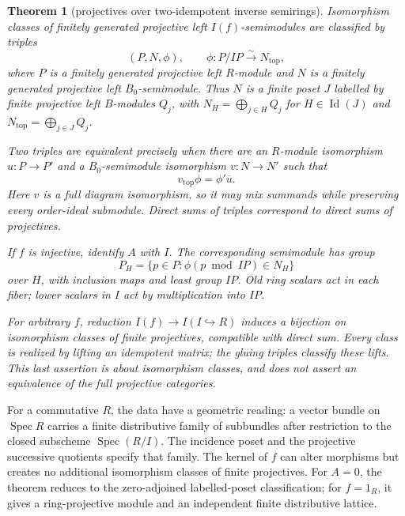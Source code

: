 \documentclass[11pt]{amsart}
\DeclareMathOperator{\Spec}{Spec}
\DeclareMathOperator{\Id}{Id}
\newtheorem{theorem}{Theorem}[section]
\theoremstyle{definition}
\theoremstyle{remark}
\begin{document}
\begin{theorem}[projectives over two-idempotent inverse semirings]\label{thm:twolevelprojectives}
Isomorphism classes of finitely generated projective left $I(f)$-semimodules are classified by triples
\[
 (P,N,\phi),\qquad \phi:P/IP\xrightarrow{\sim}N_{\mathrm{top}},
\]
where $P$ is a finitely generated projective left $R$-module and $N$ is a finitely generated projective left $B_0$-semimodule. Thus $N$ is a finite poset $J$ labelled by finite projective left $B$-modules $Q_j$, with $N_H=\bigoplus_{j\in H}Q_j$ for $H\in\Id(J)$ and $N_{\mathrm{top}}=\bigoplus_{j\in J}Q_j$.

Two triples are equivalent precisely when there are an $R$-module isomorphism $u:P\to P'$ and a $B_0$-semimodule isomorphism $v:N\to N'$ such that
\[
 v_{\mathrm{top}}\phi=\phi'\overline u.
\]
Here $v$ is a full diagram isomorphism, so it may mix summands while preserving every order-ideal submodule. Direct sums of triples correspond to direct sums of projectives.

If $f$ is injective, identify $A$ with $I$. The corresponding semimodule has group
\begin{equation}\label{eq:twolevelfiber}
 P_H=\{p\in P:\phi(p\bmod IP)\in N_H\}
\end{equation}
over $H$, with inclusion maps and least group $IP$. Old ring scalars act in each fiber; lower scalars in $I$ act by multiplication into $IP$.

For arbitrary $f$, reduction $I(f)\to I(I\hookrightarrow R)$ induces a bijection on isomorphism classes of finite projectives, compatible with direct sum. Every class is realized by lifting an idempotent matrix; the gluing triples classify these lifts. This last assertion is about isomorphism classes, and does not assert an equivalence of the full projective categories.
\end{theorem}

For a commutative $R$, the data have a geometric reading: a vector bundle on $\Spec R$ carries a finite distributive family of subbundles after restriction to the closed subscheme $\Spec(R/I)$. The incidence poset and the projective successive quotients specify that family. The kernel of $f$ can alter morphisms but creates no additional isomorphism classes of finite projectives. For $A=0$, the theorem reduces to the zero-adjoined labelled-poset classification; for $f=1_R$, it gives a ring-projective module and an independent finite distributive lattice.
\end{document}
